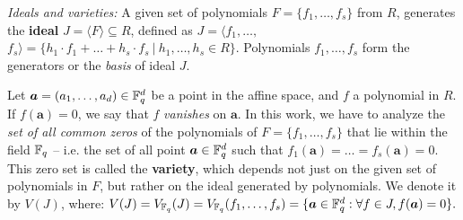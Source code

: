 
{\it Ideals and varieties:} A given set of polynomials 
$F=\{f_1,\dots,f_s\}$ from $R$, generates the {\bf ideal} $J = \langle
F \rangle \subseteq R$, defined as $J = \langle f_1,\dots,$ $ f_s \rangle = \{
h_1\cdot f_1 + \dots+h_s\cdot f_s~|~h_1,\dots,h_s\in R\}$. 
Polynomials $f_1,\dots,f_s$ form the generators or the {\it basis} of ideal $J$.



Let $\bm{a} = (a_1,\dots,a_d) \in {\mathbb{F}}_{q}^d$ be a point in the affine
space, and $f$ a polynomial in $R$. If $f(\bm{a}) = 0$, we say
that $f$ {\it vanishes} on $\bm{a}$. In this work, we have to analyze
the {\it set of all common zeros} of the polynomials of $F = 
\{f_1,\dots,f_s\}$  that lie within the field ${\mathbb{F}}_{q}$ -- i.e. the set of
all point $\bm{a} \in {\mathbb{F}}_{q}^d$ such that
$f_1(\bm{a})=\dots=f_s(\bm{a})=0$. This zero set is called the {\bf
  variety}, which depends not just on the given set of polynomials in
$F$, but rather on the ideal generated by polynomials. We denote it by
$V(J)$, where: $ V(J)= V_{{\mathbb{F}}_{q}}(J) = V_{{\mathbb{F}}_{q}}(f_1,\dots,f_s) = \{\bm{a} 
\in {\mathbb{F}}_{q}^d: \forall f \in J, f(\bm{a}) = 0\}.$

